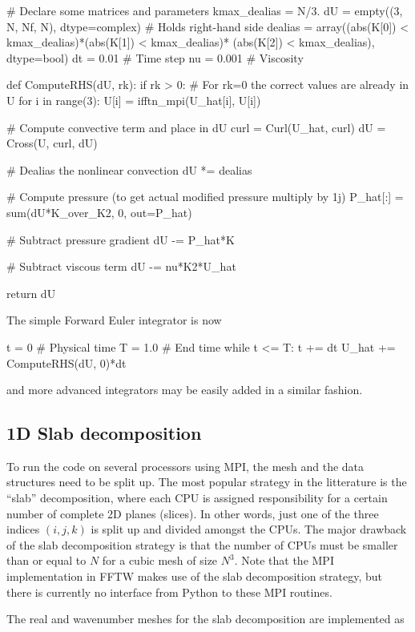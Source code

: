 \documentclass[11pt, oneside]{article}
\begin{document}
\begin{python}
# Declare some matrices and parameters
kmax_dealias = N/3.
dU = empty((3, N, Nf, N), dtype=complex)  # Holds right-hand side
dealias = array((abs(K[0]) < kmax_dealias)*(abs(K[1]) < kmax_dealias)*
                (abs(K[2]) < kmax_dealias), dtype=bool)
dt = 0.01    # Time step
nu = 0.001   # Viscosity

def ComputeRHS(dU, rk):
    if rk > 0: # For rk=0 the correct values are already in U
        for i in range(3):
            U[i] = ifftn_mpi(U_hat[i], U[i])

    # Compute convective term and place in dU
    curl = Curl(U_hat, curl)
    dU = Cross(U, curl, dU)

    # Dealias the nonlinear convection
    dU *= dealias

    # Compute pressure (to get actual modified pressure multiply by 1j)
    P_hat[:] = sum(dU*K_over_K2, 0, out=P_hat)

    # Subtract pressure gradient
    dU -= P_hat*K

    # Subtract viscous term
    dU -= nu*K2*U_hat

    return dU
\end{python}
The simple Forward Euler integrator is now
\begin{python}
t = 0        # Physical time
T = 1.0      # End time
while t <= T:
    t += dt
    U_hat += ComputeRHS(dU, 0)*dt
\end{python}
and more advanced integrators may be easily added in a similar fashion.

\subsection{1D Slab decomposition}
\label{slab1D}

To run the code on several processors using MPI, the mesh and the data structures need to be split up. The most popular strategy in the litterature is the ``slab'' decomposition, where each CPU is assigned responsibility for a certain number of complete 2D planes (slices). In other words, just one of the three indices $(i,j,k)$ is split up and divided amongst the CPUs. The major drawback of the slab decomposition strategy is that the number of CPUs must be smaller than or equal to $N$ for a cubic mesh of size $N^3$. Note that the MPI implementation in FFTW makes use of the slab decomposition strategy, but there is currently no interface from Python to these MPI routines.

The real and wavenumber meshes for the slab decomposition are implemented as
\end{document}
